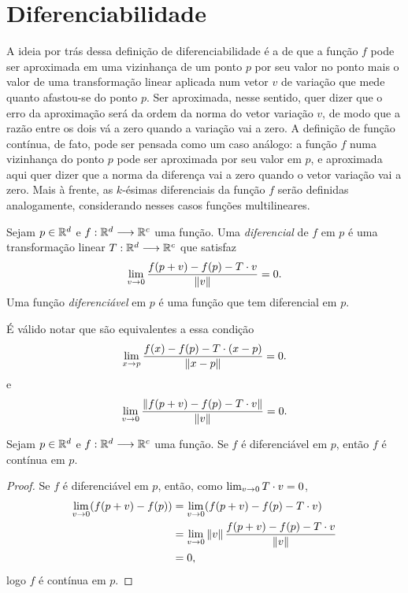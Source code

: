 \section{Diferenciabilidade}

A ideia por trás dessa definição de diferenciabilidade é a de que a função $f$ pode ser aproximada em uma vizinhança de um ponto $p$ por seu valor no ponto mais o valor de uma transformação linear aplicada num vetor $v$ de variação que mede quanto afastou-se do ponto $p$. Ser aproximada, nesse sentido, quer dizer que o erro da aproximação será da ordem da norma do vetor variação $v$, de modo que a razão entre os dois vá a zero quando a variação vai a zero. A definição de função contínua, de fato, pode ser pensada como um caso análogo: a função $f$ numa vizinhança do ponto $p$ pode ser aproximada por seu valor em $p$, e aproximada aqui quer dizer que a norma da diferença vai a zero quando o vetor variação vai a zero. Mais à frente, as $k$-ésimas diferenciais da função $f$ serão definidas analogamente, considerando nesses casos funções multilineares.

\begin{defi}
Sejam $p \in \mathbb{R}^d$ e $f: \mathbb{R}^d \longrightarrow \mathbb{R}^c$ uma função. Uma \emph{diferencial} de $f$ em $p$ é uma transformação linear $T : \mathbb{R}^d \longrightarrow \mathbb{R}^c$ que satisfaz
	\begin{equation*}
	\lim_{v \rightarrow 0} \frac{f(p+v)-f(p)-T \cdot v}{\left\Vert{v}\right\Vert} = 0.
	\end{equation*}
Uma função \emph{diferenciável} em $p$ é uma função que tem diferencial em $p$.
\end{defi}

É válido notar que são equivalentes a essa condição
	\begin{equation*}
	\lim_{x \rightarrow p} \frac{f(x)-f(p)-T\cdot(x-p)}{\left\Vert{x-p}\right\Vert} = 0.
	\end{equation*}
e
	\begin{equation*}
	\lim_{v \rightarrow 0} \frac{\left\Vert{f(p+v)-f(p)-T \cdot v}\right\Vert}{\left\Vert{v}\right\Vert} = 0.
	\end{equation*}

\begin{prop}
Sejam $p \in \mathbb{R}^d$ e $f: \mathbb{R}^d \longrightarrow \mathbb{R}^c$ uma função. Se $f$ é diferenciável em $p$, então $f$ é contínua em $p$.
\end{prop}
\begin{proof}
Se $f$ é diferenciável em $p$, então, como $\lim_{v \rightarrow 0} T \cdot v = 0$,
	\begin{align*}
	\lim_{v \rightarrow 0} (f(p+v)-f(p)) &= \lim_{v \rightarrow 0}(f(p+v)-f(p)-T \cdot v) \\
		&= \lim_{v \rightarrow 0}\left\Vert{v}\right\Vert \frac{f(p+v)-f(p)-T \cdot v}{\left\Vert{v}\right\Vert} \\
		&= 0,
	\end{align*}
logo $f$ é contínua em $p$.
\end{proof}

